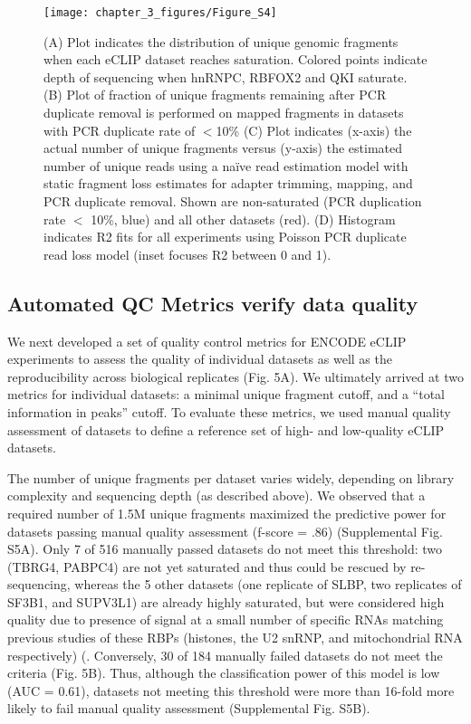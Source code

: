 \begin{figure}[ht]
  \centering
  \texttt{[image: chapter\_3\_figures/Figure\_S4]}
  \caption[Supplementary Figure 4. eCLIP Sequencing Depth Recommendations]{(A) Plot indicates the distribution of unique genomic fragments when each eCLIP dataset reaches saturation. Colored points indicate depth of sequencing when hnRNPC, RBFOX2 and QKI saturate. (B) Plot of fraction of unique fragments remaining after PCR duplicate removal is performed on mapped fragments in datasets with PCR duplicate rate of $<$10\% (C) Plot indicates (x-axis) the actual number of unique fragments versus (y-axis) the estimated number of unique reads using a naïve read estimation model with static fragment loss estimates for adapter trimming, mapping, and PCR duplicate removal. Shown are non-saturated (PCR duplication rate $<$ 10\%, blue) and all other datasets (red). (D) Histogram indicates R2 fits for all experiments using Poisson PCR duplicate read loss model (inset focuses R2 between 0 and 1). }
  \label{fig:Figure_S4}
\end{figure}

\subsection{Automated QC Metrics verify data quality}
We next developed a set of quality control metrics for ENCODE eCLIP experiments to assess the quality of individual datasets as well as the reproducibility across biological replicates (Fig. 5A). We ultimately arrived at two metrics for individual datasets: a minimal unique fragment cutoff, and a “total information in peaks” cutoff. To evaluate these metrics, we used manual quality assessment of datasets to define a reference set of high- and low-quality eCLIP datasets.

The number of unique fragments per dataset varies widely, depending on library complexity and sequencing depth (as described above). We observed that a required number of 1.5M unique fragments maximized the predictive power for datasets passing manual quality assessment (f-score = .86) (Supplemental Fig. S5A). Only 7 of 516 manually passed datasets do not meet this threshold: two (TBRG4, PABPC4) are not yet saturated and thus could be rescued by re-sequencing, whereas the 5 other datasets (one replicate of SLBP, two replicates of SF3B1, and SUPV3L1) are already highly saturated, but were considered high quality due to presence of signal at a small number of specific RNAs matching previous studies of these RBPs (histones, the U2 snRNP, and mitochondrial RNA respectively) (\cite{Townley-Tilson2006,Hodges1994,Borowski2013}. Conversely, 30 of 184 manually failed datasets do not meet the criteria (Fig. 5B). Thus, although the classification power of this model is low (AUC = 0.61), datasets not meeting this threshold were more than 16-fold more likely to fail manual quality assessment (Supplemental Fig. S5B).

